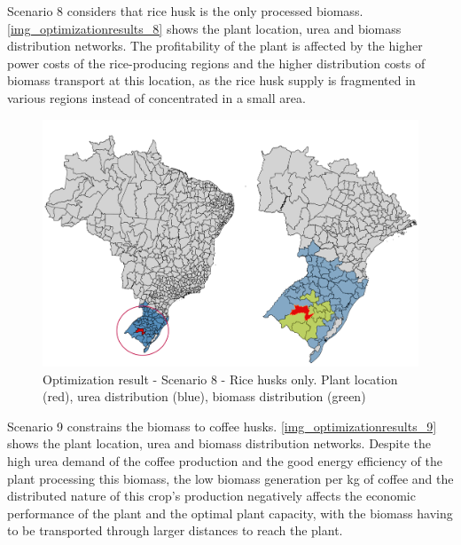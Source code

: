 \documentclass[a4paper, titlepage]{article}
\begin{document}
Scenario 8 considers that rice husk is the only processed biomass. \autoref{img_optimizationresults_8} shows the plant
location, urea and biomass distribution networks. The profitability of the plant is affected by the
higher power costs of the rice-producing regions and the higher distribution costs of biomass transport at this location,
as the rice husk supply is fragmented in various regions instead of concentrated in a small area.

\begin{figure}[htb]
    \includegraphics[width=\textwidth]{img/optimization_result_8.png}
    \caption{Optimization result - Scenario 8 - Rice husks only. Plant location (red), urea distribution (blue), biomass distribution (green)}
    \label{img_optimizationresults_8}
\end{figure}

Scenario 9 constrains the biomass to coffee husks. \autoref{img_optimizationresults_9} shows the plant location, urea
and biomass distribution networks. Despite the high urea demand of the coffee production and the good energy efficiency
of the plant processing this biomass, the low biomass generation per kg of coffee and the distributed nature of this
crop's production negatively affects the economic performance of the plant and the optimal plant capacity, with the
biomass having to be transported through larger distances to reach the plant.
\end{document}
